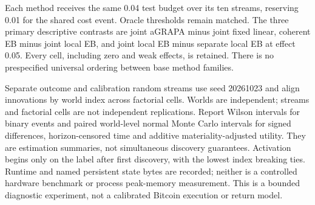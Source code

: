Each method receives the same 0.04 test budget over its ten streams, reserving
0.01 for the shared cost event. Oracle thresholds remain matched. The three
primary descriptive contrasts are joint aGRAPA minus joint fixed linear,
coherent EB minus joint local EB, and joint local EB minus separate local EB
at effect 0.05. Every cell, including zero and weak effects, is retained.
There is no prespecified universal ordering between base method families.

Separate outcome and calibration random streams use seed 20261023 and align
innovations by world index across factorial cells. Worlds are independent;
streams and factorial cells are not independent replications. Report Wilson
intervals for binary events and paired world-level normal Monte Carlo
intervals for signed differences, horizon-censored time and additive
materiality-adjusted utility. They are estimation summaries, not simultaneous
discovery guarantees. Activation begins only on the label after first
discovery, with the lowest index breaking ties. Runtime and named persistent
state bytes are recorded; neither is a controlled hardware benchmark or
process peak-memory measurement. This is a bounded diagnostic experiment,
not a calibrated Bitcoin execution or return model.
